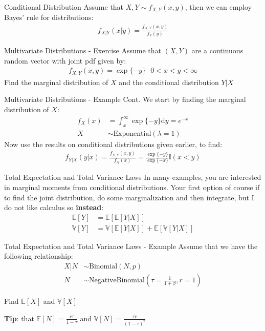 \documentclass{beamer}
\begin{document}
\begin{frame}{Conditional Distribution}
Assume that $X, Y \sim f_{X,Y}(x, y)$, then we can employ Bayes' rule for distributions:
\begin{align*}
f_{X|Y}(x|y) = \frac{f_{X, Y}(x, y)}{f_{Y}(y)}
\end{align*}
\end{frame}

\begin{frame}{Multivariate Distributions - Exercise}
Assume that $(X, Y)$ are a continuous random vector with joint pdf given by:
\begin{align*}
f_{X, Y}(x, y) = \exp\{-y\}\>\>\> 0<x<y<\infty
\end{align*}
Find the marginal distribution of $X$ and the conditional distribution $Y|X$
\end{frame}



\begin{frame}{Multivariate Distributions - Example Cont.}
We start by finding the marginal distribution of $X$:
\begin{align*}
f_{X}(x) &= \int_{x}^{\infty} \exp\{ -y \}\mathrm{d}y = e^{-x} \\
X&\sim\mathrm{Exponential}(\lambda = 1)
\end{align*}
Now use the results on conditional distributions given earlier, to find:
\begin{align*}
f_{Y|X}(y|x) =  \frac{f_{X, Y}(x, y)}{f_{X}(x)} = \frac{\exp\{ -y\}}{\exp{\{ -x\}}} \mathbb{I}(x<y)
\end{align*}
\end{frame}

\begin{frame}{Total Expectation and Total Variance Laws}
In many examples, you are interested in marginal moments from conditional distributions. Your first option of course if to find the joint distribution, do some marginalization and then integrate, but I do not like calculus so \textbf{instead}:
\begin{align*}
\mathbb{E}[Y] &= \mathbb{E}[\mathbb{E}[Y|X]] \\
\mathbb{V}[Y] &= \mathbb{V}[\mathbb{E}[Y|X]] + \mathbb{E}[\mathbb{V}[Y|X]]
\end{align*}
\end{frame}

\begin{frame}{Total Expectation and Total Variance Laws - Example}
Assume that we have the following relationship:
\begin{align*}
X|N &\sim \mathrm{Binomial}(N, p) \\
N &\sim\mathrm{Negative Binomial}(\tau = \frac{1}{1+\beta}, r = 1)
\end{align*}
\newline

Find $\mathbb{E}[X]$ and $\mathbb{V}[X]$
\newline

\textbf{Tip}: that $\mathbb{E}[N] = \frac{r\tau}{1-\tau}$ and $\mathbb{V}[N] = \frac{\tau r}{(1-\tau)^{2}} $
\end{frame}
\end{document}
